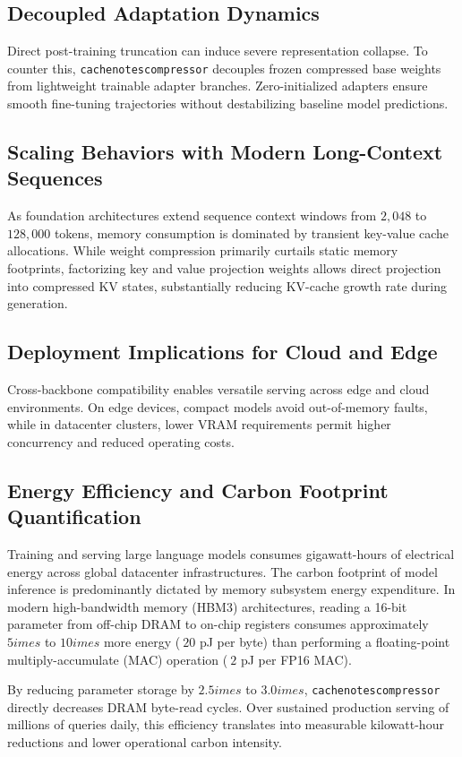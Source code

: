 \subsection{Decoupled Adaptation Dynamics}
Direct post-training truncation can induce severe representation collapse. To counter this, \texttt{cachenotescompressor} decouples frozen compressed base weights from lightweight trainable adapter branches. Zero-initialized adapters ensure smooth fine-tuning trajectories without destabilizing baseline model predictions.

\subsection{Scaling Behaviors with Modern Long-Context Sequences}
As foundation architectures extend sequence context windows from $2{,}048$ to $128{,}000$ tokens, memory consumption is dominated by transient key-value cache allocations. While weight compression primarily curtails static memory footprints, factorizing key and value projection weights allows direct projection into compressed KV states, substantially reducing KV-cache growth rate during generation.

\subsection{Deployment Implications for Cloud and Edge}
Cross-backbone compatibility enables versatile serving across edge and cloud environments. On edge devices, compact models avoid out-of-memory faults, while in datacenter clusters, lower VRAM requirements permit higher concurrency and reduced operating costs.

\subsection{Energy Efficiency and Carbon Footprint Quantification}
Training and serving large language models consumes gigawatt-hours of electrical energy across global datacenter infrastructures. The carbon footprint of model inference is predominantly dictated by memory subsystem energy expenditure. In modern high-bandwidth memory (HBM3) architectures, reading a 16-bit parameter from off-chip DRAM to on-chip registers consumes approximately $5	imes$ to $10	imes$ more energy ($~20$ pJ per byte) than performing a floating-point multiply-accumulate (MAC) operation ($~2$ pJ per FP16 MAC).

By reducing parameter storage by $2.5	imes$ to $3.0	imes$, \texttt{cachenotescompressor} directly decreases DRAM byte-read cycles. Over sustained production serving of millions of queries daily, this efficiency translates into measurable kilowatt-hour reductions and lower operational carbon intensity.


